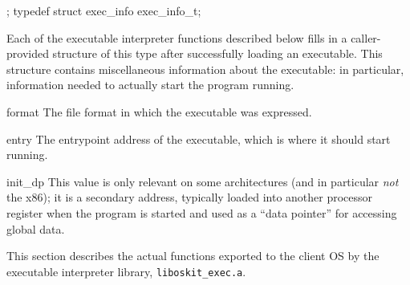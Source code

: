 \label{exec-info}
\begin{apisyn}

	;
	typedef struct exec_info exec_info_t;
\end{apisyn}
\begin{apidesc}
	Each of the executable interpreter functions described below
	fills in a caller-provided structure of this type
	after successfully loading an executable.
	This structure contains miscellaneous information
	about the executable:
	in particular,
	information needed to actually start the program running.
	\begin{icsymlist}
	\item[format]	The file format in which the executable was expressed.
	\item[entry]	The entrypoint address of the executable,
			which is where it should start running.
	\item[init_dp]	This value is only relevant on some architectures
			(and in particular \emph{not} the x86);
			it is a secondary address,
			typically loaded into another processor register
			when the program is started
			and used as a ``data pointer''
			for accessing global data.
	\end{icsymlist}
\end{apidesc}


This section describes the actual functions
exported to the client OS by the executable interpreter library,
\texttt{liboskit_exec.a}.

